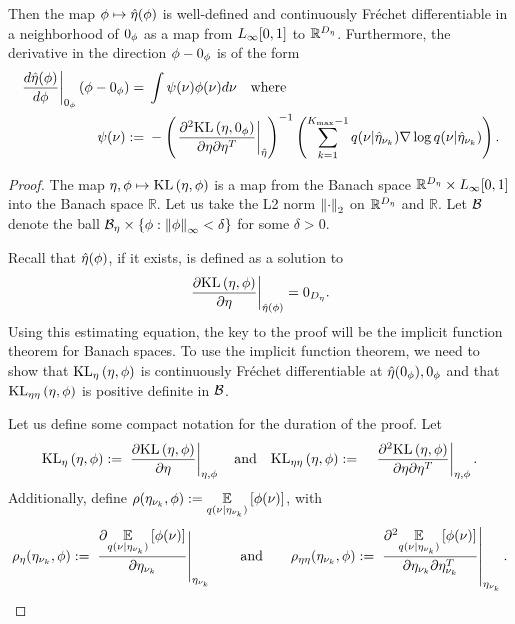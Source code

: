 \begin{thm}
%
Then the map $\phi \mapsto \hat\eta(\phi)$ is well-defined and continuously
Fr{\'e}chet differentiable in a neighborhood of $0_\phi$ as a map from ${L_{\infty}[0,1]}$ to
$\mathbb{R}^{D_{\eta}}$. Furthermore, the derivative in the direction $\phi -
0_\phi$ is of the form
%
\begin{align*}
%
\fracat{d \etaopt(\phi)}{d\phi}{\phiz}\left( \phi - \phiz\right) ={}&
    \int \infl(\nu) \phi(\nu) d\nu \mathtxt{where} \\
%
\infl(\nu) :={}&
-\left(\fracat{\partial^2 \KL{\eta, \phiz}}
                {\partial \eta \partial \eta^T}
                {\etaopt}\right)^{-1}
\left(
    \sumkm
    \q(\nu \vert \etaoptnuk)
    \nabla \log \q(\nu \vert \etaoptnuk)
\right).
%
\end{align*}
%

%

\begin{proof}
%
The map $\eta, \phi \mapsto \mathrm{KL}\left(\eta, \phi\right)$ is a map from the Banach space
$\mathbb{R}^{D_{\eta}} \times {L_{\infty}[0,1]}$ into the Banach space $\mathbb{R}$. Let us
take the L2 norm $\left\Vert\cdot\right\Vert_2$ on $\mathbb{R}^{{D_{\eta}}}$ and $\mathbb{R}$.
Let $\mathcal{B}$ denote the ball $\mathcal{B}_\eta \times \{ \phi: \left\Vert\phi\right\Vert_{\infty} <
\delta\}$ for some $\delta > 0$.

Recall that $\hat\eta(\phi)$, if it exists, is defined as a solution to
%
\begin{align*}
%
\fracat{\partial \KL{\eta, \phi}}
                {\partial \eta}
                {\etaopt(\phi)} = 0_\etadim.
%
\end{align*}
%
Using this estimating equation, the key to the proof will be the implicit
function theorem for Banach spaces. To use the implicit function theorem, we
need to show that $\mathrm{KL}_{\eta}\left(\eta, \phi\right)$ is continuously Fr{\'e}chet
differentiable at $\hat\eta(0_\phi), 0_\phi$ and that $\mathrm{KL}_{\eta\eta}\left(\eta, \phi\right)$ is
positive definite in $\mathcal{B}$.


Let us define some compact notation for the duration of the proof.
Let
%
\begin{align*}
%
\KLgrad{\eta, \phi} :={}&
    \fracat{\partial \KL{\eta, \phi}}{\partial \eta}{\eta, \phi}
\mathtxt{and}
\KLhess{\eta, \phi} :={}&
    \fracat{\partial^2 \KL{\eta, \phi}}
           {\partial \eta \partial \eta^T}{\eta, \phi}.
%
\end{align*}
%
Additionally, define $\rho(\eta_{\nu_{k}}, \phi) :={} \underset{q(\nu \vert
\eta_{\nu_{k}})}{\mathbb{E}}\left[\phi(\nu)\right]$, with
%
\begin{align*}
%
\rho_\eta(\etanuk, \phi) :={}
    \fracat{\partial \expect{\q(\nu \vert \etanuk)}{\phi(\nu)}}
           {\partial \etanuk}{\etanuk} \mathand
\rho_{\eta\eta}(\etanuk, \phi) :={}
   \fracat{\partial^2 \expect{\q(\nu \vert \etanuk)}{\phi(\nu)}}
          {\partial \etanuk \partial \etanuk^T}{\etanuk}.
%
\end{align*}
%





\end{proof}
\end{thm}
